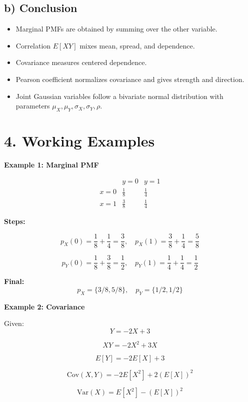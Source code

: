 \documentclass[12pt]{article}
\begin{document}
\subsection*{b) Conclusion}

\begin{itemize}
\item Marginal PMFs are obtained by summing over the other variable.
\item Correlation $E[XY]$ mixes mean, spread, and dependence.
\item Covariance measures centered dependence.
\item Pearson coefficient normalizes covariance and gives strength and direction.
\item Joint Gaussian variables follow a bivariate normal distribution with parameters $\mu_X, \mu_Y, \sigma_X, \sigma_Y, \rho$.
\end{itemize}

\section*{4. Working Examples}

\textbf{Example 1: Marginal PMF}

\[
\begin{array}{c|cc}
 & y=0 & y=1 \\
\hline
x=0 & \frac{1}{8} & \frac{1}{4} \\
x=1 & \frac{3}{8} & \frac{1}{4}
\end{array}
\]

\textbf{Steps:}

\[
p_X(0) = \frac{1}{8} + \frac{1}{4} = \frac{3}{8}, \quad
p_X(1) = \frac{3}{8} + \frac{1}{4} = \frac{5}{8}
\]

\[
p_Y(0) = \frac{1}{8} + \frac{3}{8} = \frac{1}{2}, \quad
p_Y(1) = \frac{1}{4} + \frac{1}{4} = \frac{1}{2}
\]

\textbf{Final:}
\[
p_X = \{3/8, 5/8\}, \quad p_Y = \{1/2, 1/2\}
\]

\vspace{10pt}

\textbf{Example 2: Covariance}

Given:
\[
Y = -2X + 3
\]

\[
XY = -2X^2 + 3X
\]

\[
E[Y] = -2E[X] + 3
\]

\[
\mathrm{Cov}(X,Y) = -2E[X^2] + 2(E[X])^2
\]

\[
\mathrm{Var}(X) = E[X^2] - (E[X])^2
\]
\end{document}

